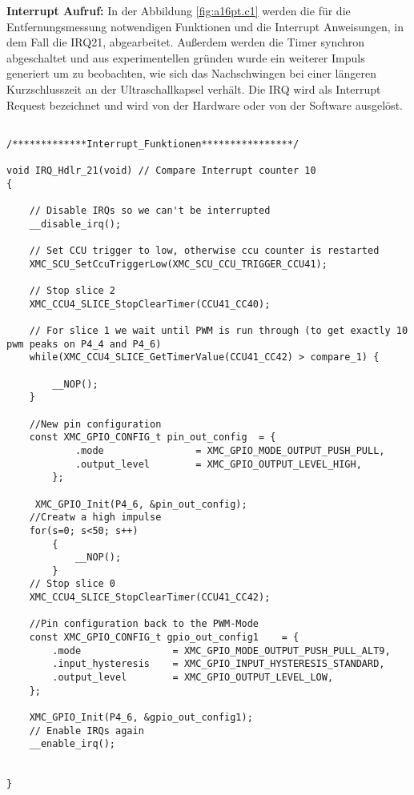 \textbf{Interrupt Aufruf:}
In der Abbildung \ref{fig:a16pt.c1} werden die für die Entfernungsmessung notwendigen Funktionen und die Interrupt Anweisungen, in dem Fall die IRQ21, abgearbeitet. Außerdem werden die Timer synchron abgeschaltet und aus experimentellen gründen wurde ein weiterer Impuls generiert um zu beobachten, wie sich das Nachschwingen bei einer längeren Kurzschlusszeit an der Ultraschallkapsel verhält. Die IRQ wird als Interrupt Request bezeichnet und wird von der Hardware oder von der Software ausgelöst.
\\
\begin{minipage}{1\textwidth}
\begin{lstlisting}

/*************Interrupt_Funktionen****************/

void IRQ_Hdlr_21(void) // Compare Interrupt counter 10
{

	// Disable IRQs so we can't be interrupted
	__disable_irq();

	// Set CCU trigger to low, otherwise ccu counter is restarted
	XMC_SCU_SetCcuTriggerLow(XMC_SCU_CCU_TRIGGER_CCU41);

	// Stop slice 2
	XMC_CCU4_SLICE_StopClearTimer(CCU41_CC40);

	// For slice 1 we wait until PWM is run through (to get exactly 10 pwm peaks on P4_4 and P4_6)
	while(XMC_CCU4_SLICE_GetTimerValue(CCU41_CC42) > compare_1) {

		__NOP();
	}
	
	//New pin configuration
	const XMC_GPIO_CONFIG_t pin_out_config	= {
			.mode                = XMC_GPIO_MODE_OUTPUT_PUSH_PULL,
			.output_level        = XMC_GPIO_OUTPUT_LEVEL_HIGH,
		};

	 XMC_GPIO_Init(P4_6, &pin_out_config);
	//Creatw a high impulse
	for(s=0; s<50; s++)
		{
			__NOP();
		}
	// Stop slice 0
	XMC_CCU4_SLICE_StopClearTimer(CCU41_CC42);
	
	//Pin configuration back to the PWM-Mode
	const XMC_GPIO_CONFIG_t gpio_out_config1	= {
		.mode                = XMC_GPIO_MODE_OUTPUT_PUSH_PULL_ALT9,
		.input_hysteresis    = XMC_GPIO_INPUT_HYSTERESIS_STANDARD,
		.output_level        = XMC_GPIO_OUTPUT_LEVEL_LOW,
	};

	XMC_GPIO_Init(P4_6, &gpio_out_config1);
	// Enable IRQs again
	__enable_irq();


}
\end{lstlisting}
\label{fig:a16pt.c1}
\end{minipage}

